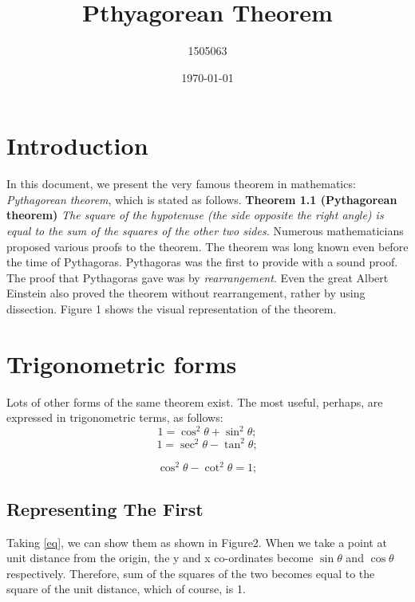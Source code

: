 \documentclass{article}
\title{Pthyagorean Theorem}
\author{1505063}
\date{\today}
\begin{document}
\maketitle

\section{Introduction}
In this document, we present the very famous theorem in mathematics: \textit{Pythagorean
theorem}, which is stated as follows.\newline
\textbf{Theorem 1.1 (Pythagorean theorem)}\textit{ The square of the hypotenuse (the
side opposite the right angle) is equal to the sum of the squares of the other two
sides.}\newline
\hspace{10mm} Numerous  mathematicians proposed various proofs to the theorem. The
theorem was long known even before the time of Pythagoras. Pythagoras was
the first to provide with a sound proof. The proof that Pythagoras gave was
by \textit{rearrangement}. Even the great Albert Einstein also proved the theorem
without rearrangement, rather by using dissection. Figure 1 shows the visual
representation of the theorem.

\section{Trigonometric forms}
Lots of other forms of the same theorem exist. The most useful, perhaps, are expressed in trigonometric terms, as follows:
\begin{equation}
\label{eq}
1 = \cos^2 \theta + \sin^2 \theta;
\end{equation}
\begin{equation}
1 = \sec^2 \theta - \tan^2 \theta;
\end{equation}

\begin{equation}
 \cos^2 {\theta}-\cot^2 \theta=1;
\end{equation}

\subsection{Representing The First}
Taking \ref{eq}, we can show them as shown in Figure2. When we take a point at
unit distance from the origin, the y and x co-ordinates become $\sin\theta$ and $\cos\theta$
respectively. Therefore, sum of the squares of the two becomes equal to the
square of the unit distance, which of course, is 1.
\end{document}
